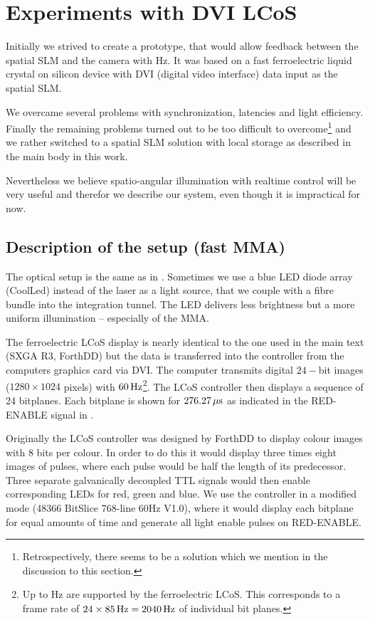 \chapter{Experiments with DVI LCoS}
\label{sec:dvi}
\begin{summary}
  Initially we strived to create a prototype, that would allow
  feedback between the spatial SLM and the camera with
  \unit[60]{Hz}. It was based on a fast ferroelectric liquid crystal
  on silicon device with DVI (digital video interface) data input as
  the spatial SLM.
  
  We overcame several problems with synchronization, latencies and
  light efficiency. Finally the remaining problems turned out to be
  too difficult to overcome\footnote{Retrospectively, there seems to
    be a solution which we mention in the discussion to this section.}
  and we rather switched to a spatial SLM solution with local storage
  as described in the main body in this work.

  Nevertheless we believe spatio-angular illumination with realtime
  control will be very useful and therefor we describe our system,
  even though it is impractical for now.
\end{summary}

\section{Description of the setup (fast MMA)}
The optical setup is the same as in . Sometimes
we use a blue LED diode array (CoolLed) instead of the laser as a
light source, that we couple with a fibre bundle into the integration
tunnel. The LED delivers less brightness but a more uniform
illumination -- especially of the MMA.

The ferroelectric LCoS display is nearly identical to the one used in
the main text (SXGA R3, ForthDD) but the data is transferred into the
controller from the computers graphics card via DVI. The computer
transmits digital $24-$bit images ($1280\times1024$ pixels) with
$\unit[60]{Hz}$\footnote{Up to \unit[85]{Hz} are supported by the
  ferroelectric LCoS. This corresponds to a frame rate of
  $24\times\unit[85]{Hz}=\unit[2040]{Hz}$ of individual bit
  planes.}. The LCoS controller then displays a sequence of 24
bitplanes. Each bitplane is shown for $\unit[276.27]{\mu s}$ as
indicated in the \textsf{RED-ENABLE} signal in .

Originally the LCoS controller was designed by ForthDD to display
colour images with 8 bits per colour. In order to do this it would
display three times eight images of pulses, where each pulse would be
half the length of its predecessor. Three separate galvanically
decoupled TTL signals would then enable corresponding LEDs for red,
green and blue. We use the controller in a modified mode (48366
BitSlice 768-line 60Hz V1.0), where it would display each bitplane for
equal amounts of time and generate all light enable pulses on
\textsf{RED-ENABLE}.

